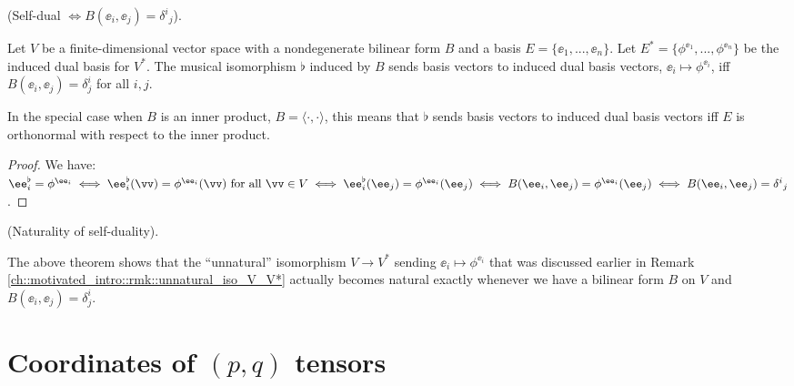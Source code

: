 \begin{theorem}
     (Self-dual $\iff B(\ee_i, \ee_j) = \delta^i{}_j$).
     
     Let $V$ be a finite-dimensional vector space with a nondegenerate bilinear form $B$ and a basis $E = \{\ee_1, ..., \ee_n\}$. Let $E^* = \{\phi^{\ee_1}, ..., \phi^{\ee_n}\}$ be the induced dual basis for $V^*$. The musical isomorphism $\flat$ induced by $B$ sends basis vectors to induced dual basis vectors, $\ee_i \mapsto \phi^{\ee_i}$, iff $B(\ee_i, 
     \ee_j) = \delta^i_j$ for all $i, j$. 
     
     In the special case when $B$ is an inner product, $B = \langle \cdot, \cdot \rangle$, this means that $\flat$ sends basis vectors to induced dual basis vectors iff $E$ is orthonormal with respect to the inner product.
\end{theorem}

\begin{proof}
    We have: $\ee_i^\flat = \phi^{\ee_i} \iff \ee_i^\flat(\vv) = \phi^{\ee_i}(\vv) \text{ for all $\vv \in V$} \iff \ee_i^\flat(\ee_j) = \phi^{\ee_i}(\ee_j) \iff B(\ee_i, \ee_j) = \phi^{\ee_i}(\ee_j) \iff B(\ee_i, \ee_j) = \delta^i{}_j$.
\end{proof}

\begin{remark}
\label{ch::bilinear_forms_metric_tensors::thm::musical_iso_unique_self_dual_iso}
    (Naturality of self-duality).

    The above theorem shows that the ``unnatural'' isomorphism $V \rightarrow V^*$ sending $\ee_i \mapsto \phi^{\ee_i}$ that was discussed earlier in Remark \ref{ch::motivated_intro::rmk::unnatural_iso_V_V*} actually becomes natural exactly whenever we have a bilinear form $B$ on $V$ and $B(\ee_i, \ee_j) = \delta^i_j$.
\end{remark}

\newpage

\section{Coordinates of $(p, q)$ tensors}

\label{ch::bilinear_forms_metric_tensors::coords_of_pq_tensors}

